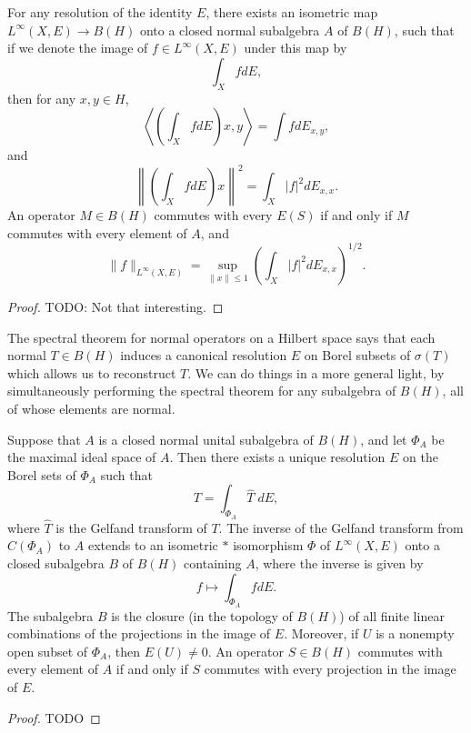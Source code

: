 \begin{theorem}
    For any resolution of the identity $E$, there exists an isometric map $L^\infty(X,E) \to B(H)$ onto a closed normal subalgebra $A$ of $B(H)$, such that if we denote the image of $f \in L^\infty(X,E)$ under this map by
    \[ \int_X f dE, \]
    then for any $x,y \in H$,
    \[ \left\langle \left(\int_X f dE \right) x, y \right\rangle = \int f dE_{x,y}, \]
    and
    \[ \left\| \left( \int_X f dE \right) x \right\|^2 = \int_X |f|^2 dE_{x,x}. \]
    An operator $M \in B(H)$ commutes with every $E(S)$ if and only if $M$ commutes with every element of $A$, and
    \[ \| f \|_{L^\infty(X,E)} = \sup_{\| x \| \leq 1} \left( \int_X |f|^2 dE_{x,x} \right)^{1/2}. \]
\end{theorem}
\begin{proof}
    TODO: Not that interesting.
\end{proof}

The spectral theorem for normal operators on a Hilbert space says that each normal $T \in B(H)$ induces a canonical resolution $E$ on Borel subsets of $\sigma(T)$ which allows us to reconstruct $T$. We can do things in a more general light, by simultaneously performing the spectral theorem for any subalgebra of $B(H)$, all of whose elements are normal.

\begin{theorem}
    Suppose that $A$ is a closed normal unital subalgebra of $B(H)$, and let $\Phi_A$ be the maximal ideal space of $A$. Then there exists a unique resolution $E$ on the Borel sets of $\Phi_A$ such that
    \[ T = \int_{\Phi_A} \widehat{T}\; dE, \]
    where $\widehat{T}$ is the Gelfand transform of $T$. The inverse of the Gelfand transform from $C(\Phi_A)$ to $A$ extends to an isometric $*$ isomorphism $\Phi$ of $L^\infty(X,E)$ onto a closed subalgebra $B$ of $B(H)$ containing $A$, where the inverse is given by
    \[ f \mapsto \int_{\Phi_A} f dE. \]
    The subalgebra $B$ is the closure (in the topology of $B(H)$) of all finite linear combinations of the projections in the image of $E$. Moreover, if $U$ is a nonempty open subset of $\Phi_A$, then $E(U) \neq 0$. An operator $S \in B(H)$ commutes with every element of $A$ if and only if $S$ commutes with every projection in the image of $E$.
\end{theorem}
\begin{proof}
    TODO
\end{proof}

